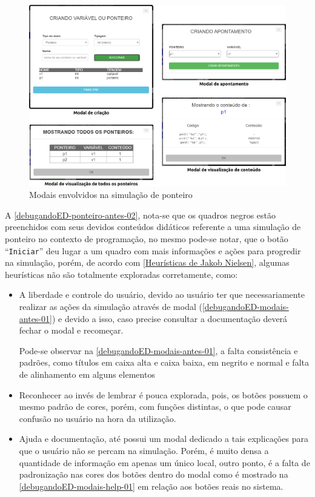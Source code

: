 \begin{figure}[htb]
    \begin{center}
	    \includegraphics[scale=0.25]{figs/debugandoED-modais-antes-01.png}
	\end{center}
    \caption{\label{debugandoED-modais-antes-01}Modais envolvidos na simulação de ponteiro}
\end{figure}

A \autoref{debugandoED-ponteiro-antes-02}, nota-se que os quadros negros estão preenchidos com seus devidos conteúdos didáticos referente a uma simulação de ponteiro no contexto de programação, no mesmo pode-se notar, que o botão “\texttt{Iniciar}” deu lugar a um quadro com mais informações e ações para progredir na simulação, porém, de acordo com \autoref{Heurísticas de Jakob Nielsen}, algumas heurísticas não são totalmente exploradas corretamente, como:
\begin{itemize}
    \item A liberdade e controle do usuário, devido ao usuário ter que necessariamente realizar as ações da simulação através de modal (\autoref{debugandoED-modais-antes-01}) e devido a isso, caso precise consultar a documentação deverá fechar o modal e recomeçar.
    
    Pode-se observar na \autoref{debugandoED-modais-antes-01}, a falta consistência e padrões, como títulos em caixa alta e caixa baixa, em negrito e normal e falta de alinhamento em alguns elementos

    \item Reconhecer ao invés de lembrar é pouca explorada, pois, os botões possuem o mesmo padrão de cores, porém, com funções distintas, o que pode causar confusão no usuário na hora da utilização.

    \item Ajuda e documentação, até possui um modal dedicado a tais explicações para que o usuário não se percam na simulação. Porém, é muito densa a quantidade de informação em apenas um único local, outro ponto, é a falta de padronização nas cores dos botões dentro do modal como é mostrado na \autoref{debugandoED-modais-help-01} em relação aos botões reais no sistema.

\end{itemize}

